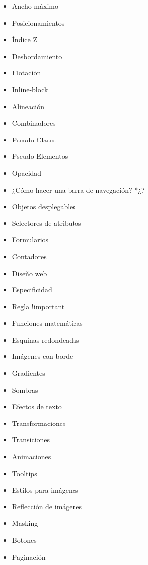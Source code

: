 \documentclass[12pt, letterpaper]{article}
\begin{document}
\begin{enumerate}
\begin{itemize}
\begin{enumerate}
\begin{itemize}
                \item Ancho máximo
                \item Posicionamientos
                \item Índice Z
                \item Desbordamiento
                \item Flotación
                \item Inline-block
                \item Alineación
                \item Combinadores
                \item Pseudo-Clases
                \item Pseudo-Elementos
                \item Opacidad
                \item ¿Cómo hacer una barra de navegación? *¿?
                \item Objetos desplegables
                \item Selectores de atributos
                \item Formularios
                \item Contadores
                \item Diseño web
                \item Especificidad
                \item Regla !important
                \item Funciones matemáticas
                \item Esquinas redondeadas
                \item Imágenes con borde
                \item Gradientes
                \item Sombras
                \item Efectos de texto
                \item Transformaciones
                \item Transiciones
                \item Animaciones
                \item Tooltips
                \item Estilos para imágenes
                \item Reflección de imágenes
                \item Masking
                \item Botones
                \item Paginación

\end{itemize}
\end{enumerate}
\end{itemize}
\end{enumerate}
\end{document}
